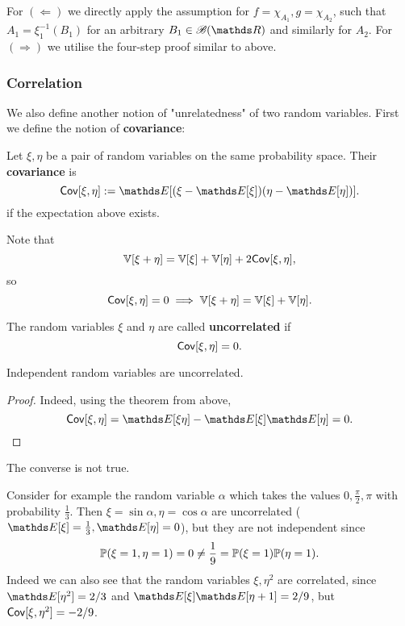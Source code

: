 \begin{hint}
For $(\Leftarrow)$ we directly apply the assumption for $f = \chi_{A_1}, g = \chi_{A_2}$, such that $A_1 = \xi_1^{-1}(B_1)$ for an arbitrary $B_1 \in \B(\R)$ and similarly for $A_2$. For $(\Rightarrow)$ we utilise the four-step proof similar to above.
\end{hint}

\subsubsection{Correlation}
We also define another notion of "unrelatedness" of two random variables. First we define the notion of \textbf{covariance}:

\begin{definition}[Covariance]
Let $\xi, \eta$ be a pair of random variables on the same probability space. Their \textbf{covariance} is
\begin{equation}
    \cov[\xi, \eta] := \E[(\xi - \E[\xi])(\eta - \E[\eta])].
\end{equation}
if the expectation above exists.
\end{definition}
\begin{remark}
Note that 
\begin{equation*}
    \mathbb{V}[\xi + \eta] = \mathbb{V}[\xi] + \mathbb{V}[\eta] + 2\mathsf{Cov}[\xi, \eta],
\end{equation*}
so 
\begin{equation*}
    \mathsf{Cov}[\xi, \eta] = 0 \implies \mathbb{V}[\xi + \eta] = \mathbb{V}[\xi] + \mathbb{V}[\eta].
\end{equation*}
\end{remark}

\begin{definition}
The random variables $\xi$ and $\eta$ are called \textbf{uncorrelated} if $$\mathsf{Cov}[\xi, \eta] = 0.$$
\end{definition}

\begin{corollary} \label{cor:independence_uncorrelated}
Independent random variables are uncorrelated.
\end{corollary}
\begin{proof}
Indeed, using the theorem from above,
\begin{equation*}
    \cov[\xi, \eta] = \E[\xi \eta] - \E[\xi]\E[\eta] = 0.
\end{equation*}
\end{proof}
The converse is not true. 

\begin{example}
    Consider for example the random variable $\alpha$ which takes the values $0,\frac{\pi}{2}, \pi$ with probability $\frac13$. Then $\xi = \sin{\alpha}, \eta = \cos{\alpha}$ are uncorrelated ($\E[\xi] = \frac13, \E[\eta] = 0$), but they are not independent since
    \begin{equation*}
        \mathbb{P}(\xi = 1, \eta = 1) = 0 \ne \frac19 = \mathbb{P}(\xi = 1)\mathbb{P}(\eta = 1).
    \end{equation*}
    Indeed we can also see that the random variables $\xi, \eta^2$ are correlated, since $\E[\eta^2] = 2/3$ and $\E[\xi] \E[\eta+1] = 2/9$, but $\mathsf{Cov}[\xi, \eta^2] = -2/9$.
\end{example}

\newpage